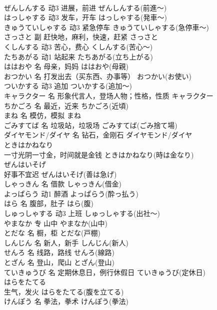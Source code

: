 \documentclass[8pt]{extreport}
\begin{document}
\begin{CJK}{UTF8}{min}
\\	ぜんしんする	动3	进展，前进	ぜんしんする(前進～)	
\\	はっしゃする	动3	发车，开车	はっしゃする(発車～)	
\\	きゅうていしゃする	动3	紧急停车	きゅうていしゃする(急停車～)	
\\	さっさと	副	赶快地，麻利，快速，赶紧	さっさと	
\\	くしんする	动3	苦心，费心	くしんする(苦心～)	
\\	たちあがる	动1	站起来	たちあがる(立ち上がる)	
\\	ははおや	名	母亲，妈妈	ははおや(母親)	
\\	おつかい	名	打发出去（买东西、办事等）	おつかい(お使い)	
\\	ついかする	动3	追加	ついかする(追加～)	
\\	キャラクター	名	形象代言人，登场人物；性格，性质	キャラクター	
\\	ちかごろ	名	最近，近来	ちかごろ(近頃)	
\\	まね	名	模仿，模拟	まね	
\\	ごみすてば	名	垃圾站，垃圾场	ごみすてば(ごみ捨て場)	
\\	ダイヤモンド/ダイヤ	名	钻石，金刚石	ダイヤモンド/ダイヤ	
\\	ときはかねなり	
\\	一寸光阴一寸金，时间就是金钱	ときはかねなり(時は金なり)	
\\	ぜんはいそげ	
\\	好事不宜迟	ぜんはいそげ(善は急げ)	
\\	しゃっきん	名	借款	しゃっきん(借金)	
\\	よっぱらう	动1	醉酒	よっぱらう(酔っ払う)	
\\	はら	名	腹部，肚子	はら(腹)	
\\	しゅっしゃする	动3	上班	しゅっしゃする(出社～)	
\\	やまなか	专	山中	やまなか(山中)	
\\	とだな	名	橱，柜	とだな(戸棚)	
\\	しんじん	名	新人，新手	しんじん(新人)	
\\	せんろ	名	线路，路线	せんろ(線路)	
\\	とざん	名	登山，爬山	とざん(登山)	
\\	ていきゅうび	名	定期休息日，例行休假日	ていきゅうび(定休日)	
\\	はらをたてる	
\\	生气，发火	はらをたてる(腹を立てる)	
\\	けんぽう	名	拳法，拳术	けんぽう(拳法)	

\end{CJK}
\end{document}
